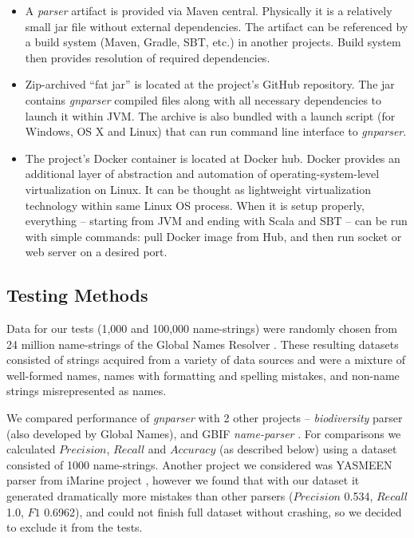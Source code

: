 \documentclass{bmcart}
\begin{document}
\begin{itemize}
  \item A \textit{parser} artifact is provided via Maven central. Physically
    it is a relatively small jar file without external dependencies. The
    artifact can be referenced by a build system (Maven, Gradle, SBT, etc.) in
    another projects. Build system then provides resolution of required
    dependencies.

  \item Zip-archived ``fat jar'' is located at the project's GitHub repository.
    The jar contains \textit{gnparser} compiled files along with all
    necessary dependencies to launch it within JVM. The archive is also bundled
    with a launch script (for Windows, OS X and Linux) that can run command
    line interface to \textit{gnparser}.

  \item The project's Docker container is located at Docker hub. Docker
    provides an additional layer of abstraction and automation of
    operating-system-level virtualization on Linux. It can be thought as
    lightweight virtualization technology within same Linux OS process. When it
    is setup properly, everything -- starting from JVM and ending with Scala
    and SBT -- can be run with simple commands: pull Docker image from Hub, and
    then run socket or web server on a desired port.

\end{itemize}

\subsection*{Testing Methods}

Data for our tests (1,000 and 100,000 name-strings) were randomly chosen from
24 million name-strings of the Global Names Resolver \cite{resolver:gn}. These
resulting datasets consisted of strings acquired from a variety of data sources
and were a mixture of well-formed names, names with formatting and spelling
mistakes, and non-name strings misrepresented as names.

We compared performance of \textit{gnparser} with 2 other projects --
\textit{biodiversity} parser \cite{biodiversity} (also developed by Global
Names), and GBIF \textit{name-parser} \cite{gbifNameParser}. For comparisons we
calculated $Precision$, $Recall$ and $Accuracy$ (as described below) using a
dataset consisted of 1000 name-strings. Another project we considered was
YASMEEN parser from iMarine project \cite{VandenBerghe2015}, however we found
that with our dataset it generated dramatically more mistakes than other
parsers ($Precision$ 0.534, $Recall$ 1.0, $F1$ 0.6962), and could not finish
full dataset without crashing, so we decided to exclude it from the tests.
\end{document}
